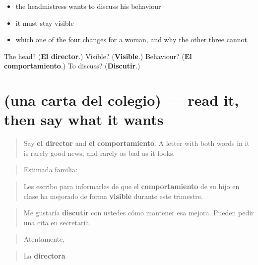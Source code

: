 \begin{itemize}
\raggedright
  \item the headmistress wants to discuss his behaviour
  \item it must stay visible
  \item which one of the four changes for a woman, and why the other three cannot
\end{itemize}

\begin{tcolorbox}[breakable,colback=teal!4,colframe=teal!35!black,title={Before you move on}]
The head? (\textbf{El director}.) Visible? (\textbf{Visible}.) Behaviour? (\textbf{El comportamiento}.) To discuss? (\textbf{Discutir}.)
\end{tcolorbox}
\section[Practice]{(una carta del colegio) — read it, then say what it wants}

\label{lesson:ES-C466-sintesis-informe}



\begin{quote}
Say \textbf{el director} and \textbf{el comportamiento}. A letter with both words in it is rarely good news, and rarely as bad as it looks.
\end{quote}

\begin{tcolorbox}[breakable,skin=enhanced,colback=orange!6,colframe=orange!45!black,boxrule=0.5pt,arc=1mm,left=6pt,right=6pt,top=4pt,bottom=4pt,fonttitle=\bfseries,title={Read this}]
\begin{quote}
Estimada familia:
\end{quote}

\begin{quote}
Les escribo para informarles de que el \textbf{comportamiento} de su hijo en clase ha mejorado de forma \textbf{visible} durante este trimestre.
\end{quote}

\begin{quote}
Me gustaría \textbf{discutir} con ustedes cómo mantener esa mejora. Pueden pedir una cita en secretaría.
\end{quote}

\begin{quote}
Atentamente,
\end{quote}

\begin{quote}
La \textbf{directora}
\end{quote}
\end{tcolorbox}

